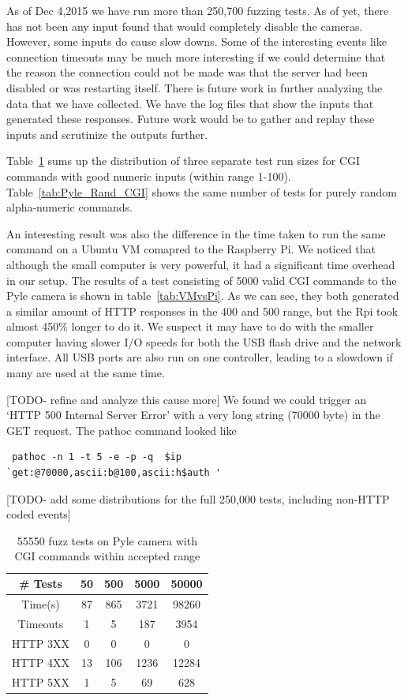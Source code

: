 \documentclass[letterpaper,twocolumn,10pt]{article}
\begin{document}
As of Dec 4,2015 we have run more than 250,700 fuzzing tests. As of yet, there has not been any input found that would completely disable the cameras. However, some inputs do cause slow downs. Some of the interesting events like connection timeouts may be much more interesting if we could determine that the reason the connection could not be made was that the server had been disabled or was restarting itself. There is future work in further analyzing the data that we have collected. We have the log files that show the inputs that generated these responses. Future work would be to gather and replay these inputs and scrutinize the outputs further. 

Table~\ref{tab:Pyle_Good_CGI} sums up the distribution of three separate test run sizes for CGI commands with good numeric inputs (within range 1-100). Table~\ref{tab:Pyle_Rand_CGI} shows the same number of tests for purely random alpha-numeric commands.

An interesting result was also the difference in the time taken to run the same command on a Ubuntu VM comapred to the Raspberry Pi. We noticed that although the small computer is very powerful, it had a significant time overhead in our setup. The results of a test consisting of 5000 valid CGI commands to the Pyle camera is shown in table~\ref{tab:VMvsPi}. As we can see, they both generated a similar amount of HTTP responses in the 400 and 500 range, but the Rpi took almost 450\% longer to do it. We suspect it may have to do with the smaller computer having slower I/O speeds for both the USB flash drive and the network interface. All USB ports are also run on one controller, leading to a slowdown if many are used at the same time.

[TODO- refine and analyze this cause more]
We found we could trigger an `HTTP 500 Internal Server Error' with a very long string (70000 byte) in the GET request. The pathoc command looked like 
\begin{verbatim} pathoc -n 1 -t 5 -e -p -q  $ip 
`get:@70000,ascii:b@100,ascii:h$auth '  \end{verbatim}

[TODO- add some distributions for the full 250,000 tests, including non-HTTP coded events]

\begin{table}[h]
\centering
	\begin{tabular}{ |c|c|c|c|c| }
		\hline
		\# Tests & 50 & 500 & 5000 & 50000 \\
		\hline
		\hline
		Time(s) & 87 & 865 & 3721 & 98260\\
		Timeouts & 1 & 5 & 187 & 3954 \\
		HTTP 3XX & 0 & 0 & 0 & 0\\
		HTTP 4XX & 13 & 106 & 1236 & 12284\\
		HTTP 5XX & 1 & 5 & 69 & 628\\
		\hline
	\end{tabular}
	\caption{55550 fuzz tests on Pyle camera with CGI commands within accepted range}
	\label{tab:Pyle_Good_CGI} 
\end{table}
\end{document}
